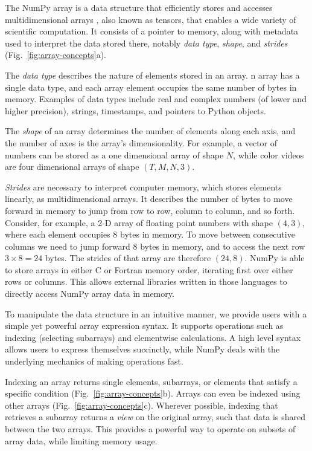 The NumPy array is a data structure that efficiently stores and accesses
multidimensional arrays \cite{vanderwalt2011numpy}, also known as tensors, that
enables a wide variety of scientific computation.
It consists of a pointer to memory, along with metadata used to interpret the
data stored there, notably {\em data type}, {\em shape}, and {\em strides}
(Fig.~\ref{fig:array-concepts}a).

The {\em data type} describes the nature of elements stored in an array.
n array has a single data type, and each array element occupies the same
number of bytes in memory.
Examples of data types include real and complex numbers (of lower and higher
precision), strings, timestamps, and pointers to Python objects.

The {\em shape} of an array determines the number of elements along each axis,
and the number of axes is the array's dimensionality.
For example, a vector of numbers can be stored as a one dimensional array of
shape $N$, while color videos are four dimensional arrays of shape
$(T, M, N, 3)$.

{\em Strides} are necessary to interpret computer memory, which stores elements
linearly, as multidimensional arrays.
It describes the number of bytes to move forward in memory to jump from row to
row, column to column, and so forth.
Consider, for example, a 2-D array of floating point numbers with shape
$(4, 3)$, where each element occupies 8 bytes in memory.
To move between consecutive columns we need to jump forward 8 bytes in memory,
and to access the next row $3 \times 8 = 24$ bytes.
The strides of that array are therefore $(24, 8)$.  NumPy is able to
store arrays in either C or Fortran memory order, iterating
first over either rows or columns.  This allows external libraries
written in those languages to directly access NumPy array data in memory.

To manipulate the data structure in an intuitive manner, we provide users with
a simple yet powerful array expression syntax.
It supports operations such as indexing (selecting subarrays) and elementwise
calculations.
A high level syntax allows users to express themselves succinctly, while NumPy
deals with the underlying mechanics of making operations fast.

Indexing an array returns single elements, subarrays, or elements that satisfy
a specific condition (Fig.~\ref{fig:array-concepts}b).
Arrays can even be indexed using other arrays (Fig.~\ref{fig:array-concepts}c).
Wherever possible, indexing that retrieves a subarray returns a {\em view} on
the original array, such that data is shared between the two arrays.
This provides a powerful way to operate on subsets of array data, while
limiting memory usage.

